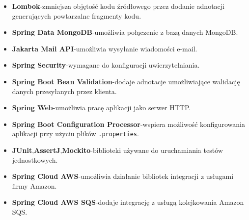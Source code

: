 \begin{itemize}
    \item \textbf{Lombok}\hspace{0.6em}-\hspace{0.6em}zmniejsza objętość kodu źródłowego przez dodanie adnotacji generujących powtarzalne fragmenty kodu.
    \item \textbf{Spring Data MongoDB}\hspace{0.6em}-\hspace{0.6em}umożliwia połączenie z bazą danych MongoDB.
    \item \textbf{Jakarta Mail API}\hspace{0.6em}-\hspace{0.6em}umożliwia wysyłanie wiadomości e-mail.
    \item \textbf{Spring Security}\hspace{0.6em}-\hspace{0.6em}wymagane do konfiguracji uwierzytelniania.
    \item \textbf{Spring Boot Bean Validation}\hspace{0.6em}-\hspace{0.6em}dodaje adnotacje umożliwiające walidację danych przesyłanych przez klienta.
    \item \textbf{Spring Web}\hspace{0.6em}-\hspace{0.6em}umożliwia pracę aplikacji jako serwer HTTP.
    \item \textbf{Spring Boot Configuration Processor}\hspace{0.6em}-\hspace{0.6em}wspiera możliwość konfigurowania aplikacji przy użyciu plików \verb|.properties|.
    \item \textbf{JUnit},\hspace{0.6em}\textbf{AssertJ},\hspace{0.6em}\textbf{Mockito}\hspace{0.6em}-\hspace{0.6em}biblioteki używane do uruchamiania testów jednostkowych.
    \item \textbf{Spring Cloud AWS}\hspace{0.6em}-\hspace{0.6em}umożliwia działanie bibliotek integracji z usługami firmy Amazon.
    \item \textbf{Spring Cloud AWS SQS}\hspace{0.6em}-\hspace{0.6em}dodaje integrację z usługą kolejkowania Amazon SQS.

\end{itemize}
